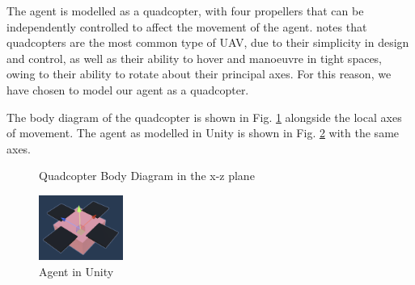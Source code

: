 \documentclass[12pt]{article}
\begin{document}
The agent is modelled as a quadcopter, with four propellers that can be independently controlled to affect the movement of the agent. \citet{Thamm} notes that quadcopters are the most common type of UAV, due to their simplicity in design and control, as well as their ability to hover and manoeuvre in tight spaces, owing to their ability to rotate about their principal axes. For this reason, we have chosen to model our agent as a quadcopter.    

The body diagram of the quadcopter is shown in Fig. \ref{fig:quadcopter} alongside the local axes of movement. The agent as modelled in Unity is shown in Fig. \ref{fig:quadcopter-unity} with the same axes.

\begin{figure}[ht]
    \centering
    \caption{Quadcopter Body Diagram in the x-z plane}
    \label{fig:quadcopter}
\end{figure}

\begin{figure}[ht]
    \centering
    \includegraphics[height=80px]{agent}
    \caption{Agent in Unity}
    \label{fig:quadcopter-unity}
\end{figure}
\end{document}
